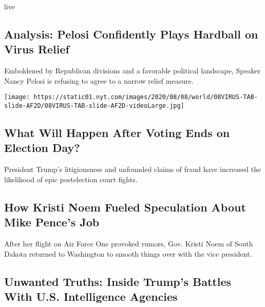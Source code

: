 live

\href{/2020/08/08/us/politics/nancy-pelosi-coronavirus-relief.html}{}

\hypertarget{analysis-pelosi-confidently-plays-hardball-on-virus-relief}{%
\subsection{Analysis: Pelosi Confidently Plays Hardball on Virus
Relief}\label{analysis-pelosi-confidently-plays-hardball-on-virus-relief}}

Emboldened by Republican divisions and a favorable political landscape,
Speaker Nancy Pelosi is refusing to agree to a narrow relief measure.

\texttt{[image: https://static01.nyt.com/images/2020/08/08/world/08VIRUS-TAB-slide-AF2D/08VIRUS-TAB-slide-AF2D-videoLarge.jpg]}

\href{/2020/08/08/us/politics/voting-nov-3-election.html}{}

\hypertarget{what-will-happen-after-voting-ends-on-election-day}{%
\subsection{What Will Happen After Voting Ends on Election
Day?}\label{what-will-happen-after-voting-ends-on-election-day}}

President Trump's litigiousness and unfounded claims of fraud have
increased the likelihood of epic postelection court fights.

\href{/2020/08/08/us/politics/kristi-noem-pence-trump.html}{}

\hypertarget{how-kristi-noem-fueled-speculation-about-mike-pences-job}{%
\subsection{How Kristi Noem Fueled Speculation About Mike Pence's
Job}\label{how-kristi-noem-fueled-speculation-about-mike-pences-job}}

After her flight on Air Force One provoked rumors, Gov. Kristi Noem of
South Dakota returned to Washington to smooth things over with the vice
president.

\href{/2020/08/08/magazine/us-russia-intelligence.html}{}

\hypertarget{unwanted-truths-inside-trumps-battles-with-us-intelligence-agencies}{%
\subsection{Unwanted Truths: Inside Trump's Battles With U.S.
Intelligence
Agencies}\label{unwanted-truths-inside-trumps-battles-with-us-intelligence-agencies}}


